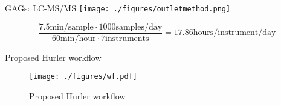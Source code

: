 \documentclass[presentation, smaller]{beamer}
\begin{document}
\begin{frame}[label={sec:orgheadline18}]{GAGs: LC-MS/MS}
\texttt{[image: ./figures/outletmethod.png]}


\[
\frac{7.5 \text{min/sample} \cdot 1000 \text{samples/day}}{60 \text{min/hour} \cdot 7 \text{instruments}}
= 17.86 \text{hours/instrument/day}
\]
\end{frame}

\begin{frame}[label={sec:orgheadline19}]{Proposed Hurler workflow}
\begin{figure}[htb]
\centering
\texttt{[image: ./figures/wf.pdf]}
\caption{\label{fig:wf}
Proposed Hurler workflow}
\end{figure}
\end{frame}
\end{document}

